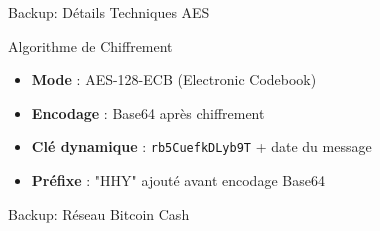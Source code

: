 \documentclass{beamer}
\begin{document}
\begin{frame}{Backup: Détails Techniques AES}
\begin{block}{Algorithme de Chiffrement}
\begin{itemize}
    \item \textbf{Mode} : AES-128-ECB (Electronic Codebook)
    \item \textbf{Encodage} : Base64 après chiffrement
    \item \textbf{Clé dynamique} : \texttt{rb5CuefkDLyb9T} + date du message
    \item \textbf{Préfixe} : "HHY" ajouté avant encodage Base64
\end{itemize}
\end{block}

\begin{center}
\ttfamily\small
{}
\end{center}
\end{frame}

\begin{frame}{Backup: Réseau Bitcoin Cash}
\begin{center}
\fbox{\begin{minipage}{10cm}
\centering
\textcolor{gray}{Diagramme détaillé\\Réseau d'obfuscation\\Bitcoin Cash}
\end{minipage}}
\end{center}
\end{frame}
\end{document}
